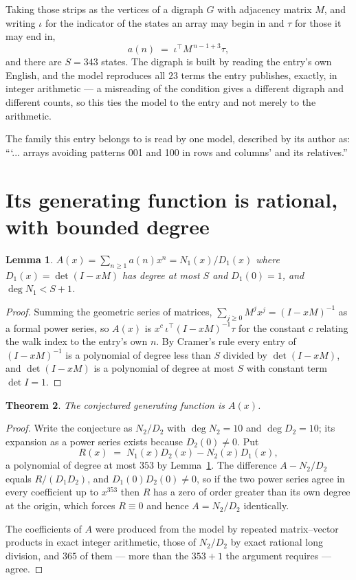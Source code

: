 \documentclass[11pt,a4paper]{article}
\theoremstyle{plain}
\newtheorem{theorem}{Theorem}
\newtheorem{lemma}[theorem]{Lemma}
\theoremstyle{definition}
\begin{document}
Taking those strips as the vertices of a digraph $G$ with adjacency matrix $M$, and writing
$\iota$ for the indicator of the states an array may begin in and $\tau$ for those it may end
in,
\[
a(n)\;=\;\iota^{\!\top}M^{\,n-1+3}\tau ,
\]
and there are $S=343$ states. The digraph is built by reading the entry's own English, and the
model reproduces all $23$ terms the entry publishes, exactly, in integer arithmetic --- a
misreading of the condition gives a different digraph and different counts, so this ties the
model to the entry and not merely to the arithmetic.

The family this entry belongs to is read by one model, described by its author as: ```... arrays avoiding patterns 001 and 100 in rows and columns' and its relatives.''


\section{Its generating function is rational, with bounded degree}

\begin{lemma}\label{lem:rat}
$A(x)=\sum_{n\ge1}a(n)x^n=N_1(x)/D_1(x)$ where $D_1(x)=\det(I-xM)$ has degree at most
$S$ and $D_1(0)=1$, and $\deg N_1<S+1$.
\end{lemma}

\begin{proof}
Summing the geometric series of matrices, $\sum_{j\ge0}M^jx^j=(I-xM)^{-1}$ as a formal
power series, so $A(x)$ is $x^{c}\,\iota^{\!\top}(I-xM)^{-1}\tau$ for the constant $c$
relating the walk index to the entry's own $n$. By Cramer's rule every entry of
$(I-xM)^{-1}$ is a polynomial of degree less than $S$ divided by $\det(I-xM)$, and
$\det(I-xM)$ is a polynomial of degree at most $S$ with constant term $\det I=1$.
\end{proof}

\begin{theorem}
The conjectured generating function is $A(x)$.
\end{theorem}

\begin{proof}
Write the conjecture as $N_2/D_2$ with $\deg N_2=10$ and $\deg D_2=10$; its expansion as a
power series exists because $D_2(0)\neq0$. Put
\[
R(x)\;=\;N_1(x)D_2(x)-N_2(x)D_1(x),
\]
a polynomial of degree at most $353$ by Lemma~\ref{lem:rat}. The difference
$A-N_2/D_2$ equals $R/(D_1D_2)$, and $D_1(0)D_2(0)\neq0$, so if the two power series agree in
every coefficient up to $x^{353}$ then $R$ has a zero of order greater than its own
degree at the origin, which forces $R\equiv0$ and hence $A=N_2/D_2$ identically.

The coefficients of $A$ were produced from the model by repeated matrix--vector products in
exact integer arithmetic, those of $N_2/D_2$ by exact rational long division, and $365$
of them --- more than the $353+1$ the argument requires --- agree.
\end{proof}
\end{document}
